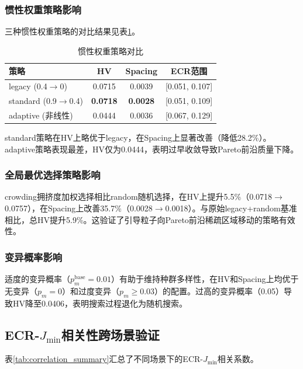 \subsubsection{惯性权重策略影响}

三种惯性权重策略的对比结果见表\ref{tab:inertia_comparison}。

\begin{table}[t]
\centering
\caption{惯性权重策略对比}
\label{tab:inertia_comparison}
\begin{tabular}{lccc}
\toprule
策略 & HV & Spacing & ECR范围 \\
\midrule
legacy (0.4$\to$0) & 0.0715 & 0.0039 & [0.051, 0.107] \\
standard (0.9$\to$0.4) & \textbf{0.0718} & \textbf{0.0028} & [0.051, 0.109] \\
adaptive (非线性) & 0.0444 & 0.0036 & [0.067, 0.129] \\
\bottomrule
\end{tabular}
\end{table}

standard策略在HV上略优于legacy，在Spacing上显著改善（降低28.2\%）。adaptive策略表现最差，HV仅为0.0444，表明过早收敛导致Pareto前沿质量下降。

\subsubsection{全局最优选择策略影响}

crowding拥挤度加权选择相比random随机选择，在HV上提升5.5\%（0.0718$\to$0.0757），在Spacing上改善35.7\%（0.0028$\to$0.0018）。与原始legacy+random基准相比，总HV提升5.9\%。这验证了引导粒子向Pareto前沿稀疏区域移动的策略有效性。

\subsubsection{变异概率影响}

适度的变异概率（$p_m^{\text{base}}=0.01$）有助于维持种群多样性，在HV和Spacing上均优于无变异（$p_m=0$）和过度变异（$p_m \geq 0.03$）的配置。过高的变异概率（0.05）导致HV降至0.0406，表明搜索过程退化为随机搜索。

\subsection{ECR-$J_{\min}$相关性跨场景验证}

表\ref{tab:correlation_summary}汇总了不同场景下的ECR-$J_{\min}$相关系数。

